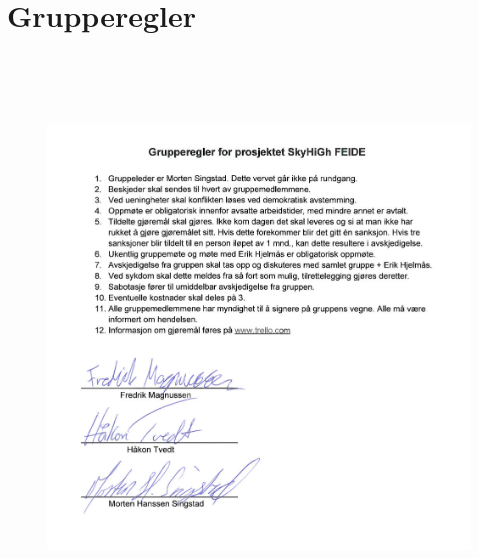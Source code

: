 \documentclass[12pt,a4paper]{article}
\begin{document}
\section{Grupperegler}
\begin{flushright}
	\begin{figure}[h]
		\includegraphics[width=150mm,height=150mm]{grupperegler.png}
 	\end{figure}
\end{flushright}
\end{document}
